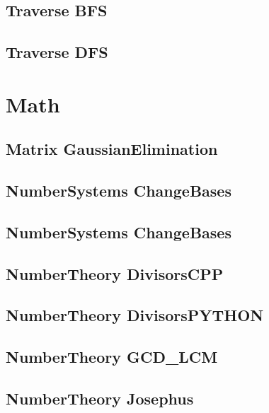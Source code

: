 \subsection{Traverse BFS}
\raggedbottom
\hrulefill
\subsection{Traverse DFS}
\raggedbottom
\hrulefill

\section{Math}
\subsection{Matrix GaussianElimination}
\raggedbottom
\hrulefill
\subsection{NumberSystems ChangeBases}
\raggedbottom
\hrulefill
\subsection{NumberSystems ChangeBases}
\raggedbottom
\hrulefill
\subsection{NumberTheory DivisorsCPP}
\raggedbottom
\hrulefill
\subsection{NumberTheory DivisorsPYTHON}
\raggedbottom
\hrulefill
\subsection{NumberTheory GCD_LCM}
\raggedbottom
\hrulefill
\subsection{NumberTheory Josephus}
\raggedbottom
\hrulefill
